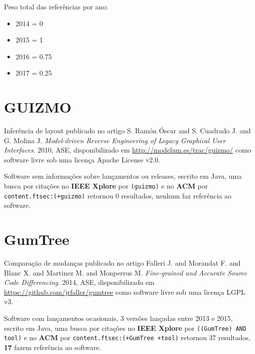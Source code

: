 Peso total das referências por ano:

\begin{itemize}
\item 2014 = 0
\item 2015 = 1
\item 2016 = 0.75
\item 2017 = 0.25
\end{itemize}


\section{GUIZMO}

Inferência de layout
publicado no artigo
S. Ram\'{o}n \'{O}scar and S. Cuadrado J. and G. Molina J.
{\it Model-driven Reverse Engineering of Legacy Graphical User Interfaces}.
2010,
ASE,
disponibilizado em \url{http://modelum.es/trac/guizmo/}
como software livre
sob uma licença Apache License v2.0.

Software sem informações sobre lançamentos ou releases,
escrito em Java,
uma busca por citações no {\bf IEEE Xplore} por
\texttt{(guizmo)}
e no {\bf ACM} por
\texttt{content.ftsec:(+guizmo)}
retornou
0 resultados,
nenhum faz referência ao software.


\section{GumTree}

Comparação de mudanças
publicado no artigo
Falleri J. and Morandat F. and Blanc X. and Martinez M. and Monperrus M.
{\it Fine-grained and Accurate Source Code Differencing}.
2014,
ASE,
disponibilizado em \url{https://github.com/jrfaller/gumtree}
como software livre
sob uma licença LGPL v3.

Software com lançamentos ocasionais,
3 versões lançadas
entre 2013 e 2015,
escrito em Java,
uma busca por citações no {\bf IEEE Xplore} por
\texttt{((GumTree) AND tool)}
e no {\bf ACM} por
\texttt{content.ftsec:(+GumTree +tool)}
retornou
37 resultados,
{\bf 17} fazem referência ao software.

